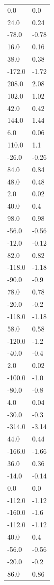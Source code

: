 \begin{longtable}{ll}
0.0 & 0.0 \\
24.0 & 0.24 \\
-78.0 & -0.78 \\
16.0 & 0.16 \\
38.0 & 0.38 \\
-172.0 & -1.72 \\
208.0 & 2.08 \\
102.0 & 1.02 \\
42.0 & 0.42 \\
144.0 & 1.44 \\
6.0 & 0.06 \\
110.0 & 1.1 \\
-26.0 & -0.26 \\
84.0 & 0.84 \\
48.0 & 0.48 \\
2.0 & 0.02 \\
40.0 & 0.4 \\
98.0 & 0.98 \\
-56.0 & -0.56 \\
-12.0 & -0.12 \\
82.0 & 0.82 \\
-118.0 & -1.18 \\
-90.0 & -0.9 \\
78.0 & 0.78 \\
-20.0 & -0.2 \\
-118.0 & -1.18 \\
58.0 & 0.58 \\
-120.0 & -1.2 \\
-40.0 & -0.4 \\
2.0 & 0.02 \\
-100.0 & -1.0 \\
-80.0 & -0.8 \\
4.0 & 0.04 \\
-30.0 & -0.3 \\
-314.0 & -3.14 \\
44.0 & 0.44 \\
-166.0 & -1.66 \\
36.0 & 0.36 \\
-14.0 & -0.14 \\
0.0 & 0.0 \\
-112.0 & -1.12 \\
-160.0 & -1.6 \\
-112.0 & -1.12 \\
40.0 & 0.4 \\
-56.0 & -0.56 \\
-20.0 & -0.2 \\
86.0 & 0.86 \\

\end{longtable}
